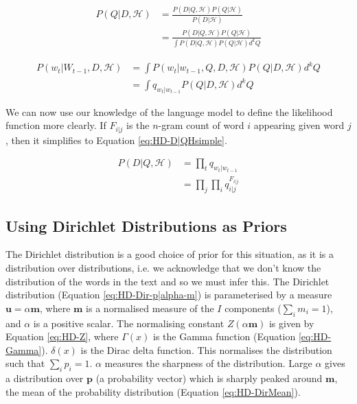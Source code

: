 \begin{align}
P(Q|D,\mathscr{H})&=\frac{P(D|Q,\mathscr{H})P(Q|\mathscr{H})}{P(D|\mathscr{H})} \nonumber
\\
&=\frac{P(D|Q,\mathscr{H})P(Q|\mathscr{H})}{\int P(D|Q,\mathscr{H})P(Q|\mathscr{H})d^{k}Q}
\label{eq:HD-Q|DH}
\end{align}

\begin{align}
P(w_{t}|W_{t-1},D,\mathscr{H})&=\int P(w_{t}|w_{t-1},Q,D,\mathscr{H})P(Q|D,\mathscr{H})d^{k}Q \nonumber
\\
&=\int q_{w_{t}|w_{t-1}}P(Q|D,\mathscr{H})d^{k}Q
\label{eq:HD-wt|wt-1DH}
\end{align}

We can now use our knowledge of the language model to define the likelihood function more clearly. If $F_{i|j}$ is the $n$-gram count of word $i$ appearing given word $j$, then it simplifies to Equation \ref{eq:HD-D|QHsimple}.

\begin{align}
P(D|Q,\mathscr{H})&=\prod_{t}q_{w_{t}|w_{t-1}} \nonumber
\\
&=\prod_{j}\prod_{i}q_{i|j}^{F_{i|j}}
\label{eq:HD-D|QHsimple}
\end{align}

\subsection{Using Dirichlet Distributions as Priors}

The Dirichlet distribution is a good choice of prior for this situation, as it is a distribution over distributions, i.e. we acknowledge that we don't know the distribution of the words in the text and so we must infer this. The Dirichlet distribution (Equation \ref{eq:HD-Dir-p|alpha-m}) is parameterised by a measure $\boldsymbol{u}=\alpha\boldsymbol{m}$, where $\boldsymbol{m}$ is a normalised measure of the $I$ components ($\sum_{i}m_{i}=1$), and $\alpha$ is a positive scalar. The normalising constant $Z(\alpha\boldsymbol{m})$ is given by Equation \ref{eq:HD-Z}, where $\Gamma(x)$ is the Gamma function (Equation \ref{eq:HD-Gamma}). $\delta(x)$ is the Dirac delta function. This normalises the distribution such that $\sum_{i}p_{i}=1$. $\alpha$ measures the sharpness of the distribution. Large $\alpha$ gives a distribution over $\boldsymbol{p}$ (a probability vector) which is sharply peaked around $\boldsymbol{m}$, the mean of the probability distribution (Equation \ref{eq:HD-DirMean}).

